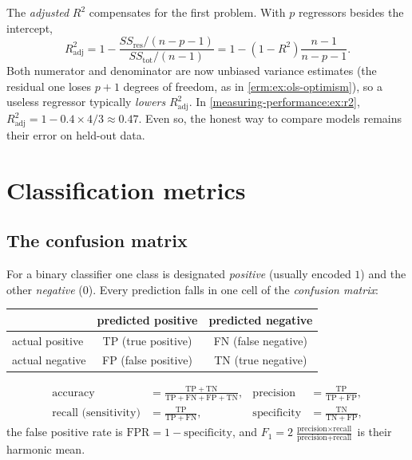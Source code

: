 \begin{notechapter}
The \emph{adjusted} $R^2$ compensates for the first problem. With $p$
regressors besides the intercept,
\[
  R^2_{\mathrm{adj}} = 1 - \frac{SS_{\mathrm{res}}/(n-p-1)}{SS_{\mathrm{tot}}/(n-1)}
  = 1 - (1 - R^2)\frac{n-1}{n-p-1}.
\]
Both numerator and denominator are now unbiased variance estimates (the
residual one loses $p+1$ degrees of freedom, as in
\cref{erm:ex:ols-optimism}), so a useless regressor typically \emph{lowers}
$R^2_{\mathrm{adj}}$. In \cref{measuring-performance:ex:r2},
$R^2_{\mathrm{adj}} = 1 - 0.4\times4/3\approx0.47$. Even so, the honest way to
compare models remains their error on held-out data.

\section{Classification metrics}\label{measuring-performance:sec:classification}

\subsection{The confusion matrix}

For a binary classifier one class is designated \emph{positive} (usually
encoded $1$) and the other \emph{negative} ($0$). Every prediction falls in
one cell of the \emph{confusion matrix}:
\begin{center}
\begin{tabular}{@{}l|cc@{}}
 & predicted positive & predicted negative \\ \midrule
actual positive & TP (true positive) & FN (false negative) \\
actual negative & FP (false positive) & TN (true negative) \\
\end{tabular}
\end{center}

\begin{definition}
\[
\begin{aligned}
  \text{accuracy} &= \frac{\mathrm{TP} + \mathrm{TN}}{\mathrm{TP}+\mathrm{FN}+\mathrm{FP}+\mathrm{TN}}, &
  \text{precision} &= \frac{\mathrm{TP}}{\mathrm{TP}+\mathrm{FP}}, \\
  \text{recall (sensitivity)} &= \frac{\mathrm{TP}}{\mathrm{TP}+\mathrm{FN}}, &
  \text{specificity} &= \frac{\mathrm{TN}}{\mathrm{TN}+\mathrm{FP}},
\end{aligned}
\]
the false positive rate is $\mathrm{FPR} = 1 - \text{specificity}$, and
$F_1 = 2\,\frac{\text{precision}\times\text{recall}}{\text{precision}+\text{recall}}$
is their harmonic mean.
\end{definition}


\end{notechapter}

